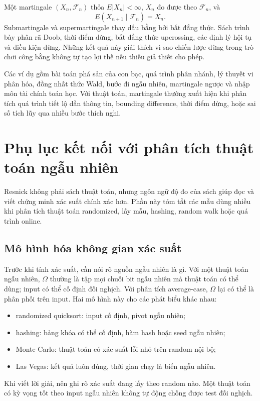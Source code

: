 \documentclass[11pt]{article}
\begin{document}
Một martingale \((X_n,\mathcal{F}_n)\) thỏa \(E|X_n|<\infty\),
\(X_n\) đo được theo \(\mathcal{F}_n\), và
\[
  E(X_{n+1}\mid\mathcal{F}_n)=X_n.
\]
Submartingale và supermartingale thay dấu bằng bởi bất đẳng thức. Sách trình
bày phân rã Doob, thời điểm dừng, bất đẳng thức upcrossing, các định lý hội tụ
và điều kiện dừng. Những kết quả này giải thích vì sao chiến lược dừng trong
trò chơi công bằng không tự tạo lợi thế nếu thiếu giả thiết cho phép.

Các ví dụ gồm bài toán phá sản của con bạc, quá trình phân nhánh, lý thuyết vi
phân hóa, đồng nhất thức Wald, bước đi ngẫu nhiên, martingale ngược và nhập môn
tài chính toán học. Với thuật toán, martingale thường xuất hiện khi phân tích
quá trình tiết lộ dần thông tin, bounding difference, thời điểm dừng, hoặc sai
số tích lũy qua nhiều bước thích nghi.

\section{Phụ lục kết nối với phân tích thuật toán ngẫu nhiên}

Resnick không phải sách thuật toán, nhưng ngôn ngữ độ đo của sách giúp đọc và
viết chứng minh xác suất chính xác hơn. Phần này tóm tắt các mẫu dùng nhiều
khi phân tích thuật toán randomized, lấy mẫu, hashing, random walk hoặc quá
trình online.

\subsection{Mô hình hóa không gian xác suất}

Trước khi tính xác suất, cần nói rõ nguồn ngẫu nhiên là gì. Với một thuật toán
ngẫu nhiên, \(\Omega\) thường là tập mọi chuỗi bit ngẫu nhiên mà thuật toán có
thể dùng; input có thể cố định đối nghịch. Với phân tích average-case, \(\Omega\)
lại có thể là phân phối trên input. Hai mô hình này cho các phát biểu khác
nhau:
\begin{itemize}
  \item randomized quicksort: input cố định, pivot ngẫu nhiên;
  \item hashing: bảng khóa có thể cố định, hàm hash hoặc seed ngẫu nhiên;
  \item Monte Carlo: thuật toán có xác suất lỗi nhỏ trên random nội bộ;
  \item Las Vegas: kết quả luôn đúng, thời gian chạy là biến ngẫu nhiên.
\end{itemize}

Khi viết lời giải, nên ghi rõ xác suất đang lấy theo random nào. Một thuật toán
có kỳ vọng tốt theo input ngẫu nhiên không tự động chống được test đối nghịch.
\end{document}
